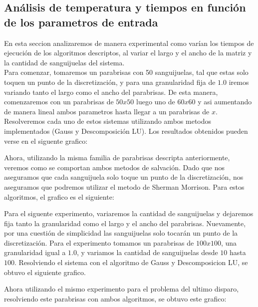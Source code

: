 \subsection{An\'alisis de temperatura y tiempos en funci\'on de los parametros de entrada}
En esta seccion analizaremos de manera experimental como varían los tiempos de ejecución de los algoritmos descriptos, al variar el largo y el ancho de la matriz y la cantidad de sanguijuelas del sistema.
\\
Para comenzar, tomaremos un parabrisas con 50 sanguijuelas, tal que estas solo toquen un punto de la discretización, y para una granularidad fija de $1.0$ iremos variando tanto el largo como el ancho del parabrisas. De esta manera, comenzaremos con un parabrisas de $50x50$ luego uno de $60x60$ y asi aumentando de manera lineal ambos parametros hasta llegar a un parabrisas de $x$. Resolveremos cada uno de estos sistemas utilizando ambos metodos implementados (Gauss y Descomposición LU). Los resultados obtenidos pueden verse en el siguente grafico:


Ahora, utilizando la misma familia de parabrisas descripta anteriormente, veremos como se comportan ambos metodos de salvación. Dado que nos aseguramos que cada sanguijuela solo toque un punto de la discretización, nos aseguramos que podremos utilizar el metodo de Sherman Morrison. Para estos algoritmos, el grafico es el siguiente:


Para el siguente experimento, variaremos la cantidad de sanguijuelas y dejaremos fija tanto la granularidad como el largo y el ancho del parabrisas. Nuevamente, por una cuestión de simplicidad las sanguijuelas solo tocarán un punto de la discretización. Para el experimento tomamos un parabrisas de $100x100$, una granularidad igual a $1.0$, y variamos la cantidad de sanguijuelas desde $10$ hasta $100$. Resolviendo el sistema con el algoritmo de Gauss y Descomposicion LU, se obtuvo el siguiente grafico.


Ahora utilizando el mismo experimento para el problema del ultimo disparo, resolviendo este parabrisas con ambos algoritmos, se obtuvo este grafico:



